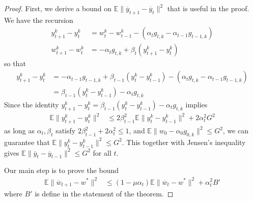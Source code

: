 \begin{proof}
	First, we derive a bound on $\mathbb{E}\|\overline{y}_{t+1}-\overline{y}_{t}\|^{2}$
	that is useful in the proof. We have the recursion 
	\begin{align*}
	y_{t+1}^{k}-y_{t}^{k} & =w_{t}^{k}-w_{t-1}^{k}-(\alpha_{t}g_{t,k}-\alpha_{t-1}g_{t-1,k})\\
	w_{t+1}^{k}-w_{t}^{k} & =-\alpha_{t}g_{t,k}+\beta_{t}(y_{t+1}^{k}-y_{t}^{k})
	\end{align*}
	so that 
	\begin{align*}
	y_{t+1}^{k}-y_{t}^{k} & =-\alpha_{t-1}g_{t-1,k}+\beta_{t-1}(y_{t}^{k}-y_{t-1}^{k})-(\alpha_{t}g_{t,k}-\alpha_{t-1}g_{t-1,k})\\
	& =\beta_{t-1}(y_{t}^{k}-y_{t-1}^{k})-\alpha_{t}g_{t,k}
	\end{align*}
	Since the identity $y_{t+1}^{k}-y_{t}^{k}=\beta_{t-1}(y_{t}^{k}-y_{t-1}^{k})-\alpha_{t}g_{t,k}$
	implies 
	\begin{align*}
	\mathbb{E}\|y_{t+1}^{k}-y_{t}^{k}\|^{2} & \leq2\beta_{t-1}^{2}\mathbb{E}\|y_{t}^{k}-y_{t-1}^{k}\|^{2}+2\alpha_{t}^{2}G^{2}
	\end{align*}
	as long as $\alpha_{t},\beta_{t}$ satisfy $2\beta_{t-1}^{2}+2\alpha_{t}^{2}\leq1$,
	and\textbf{ $\mathbb{E}\|w_{0}-\alpha_{0}g_{0,k}\|^{2}\leq G^{2}$},
	we can guarantee that $\mathbb{E}\|y_{t}^{k}-y_{t-1}^{k}\|^{2}\leq G^{2}$.
	This together with Jensen's inequality gives $\mathbb{E}\|\overline{y}_{t}-\overline{y}_{t-1}\|^{2}\leq G^{2}$
	for all $t$. 
	
	Our main step is to prove the bound 
	\begin{align*}
	\mathbb{E}\|\overline{w}_{t+1}-w^{\ast}\|^{2} & \leq(1-\mu\alpha_{t})\mathbb{E}\|\overline{w}_{t}-w^{\ast}\|^{2}+\alpha_{t}^{2}B'
	\end{align*}
	where $B'$ is define in the statement of the theorem. 
	

\end{proof}
